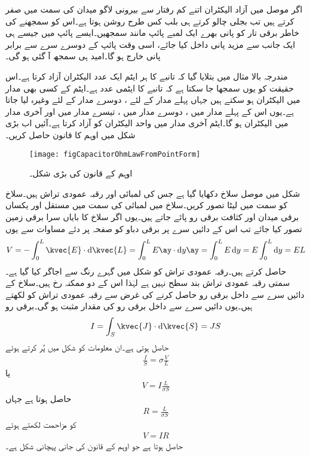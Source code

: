 اگر موصل میں آزاد الیکٹران اتنے کم رفتار سے بیرونی لاگو میدان کی سمت میں صفر کرتے ہیں تب بجلی چالو کرتے ہی بلب  کس طرح روشن ہوتا ہے۔اس کو سمجھنے کی خاطر برقی تار کو پانی بھرے ایک لمبے  پائپ مانند سمجھیں۔ایسے پائپ میں جیسے ہی ایک جانب سے مزید پانی داخل کیا جائے، اسی وقت پائپ کے دوسرے سرے سے برابر پانی خارج ہو گا۔امید ہی سمجھ آ گئی ہو گی۔  

مندرجہ بالا مثال میں بتلایا گیا کہ تانبے کا ہر ایٹم ایک عدد الیکٹران آزاد کرتا ہے۔اس حقیقت کو یوں سمجھا جا سکتا ہے کہ تانبے کا ایٹمی عدد ہے۔ایٹم کے کسی بھی مدار میں    الیکٹران ہو سکتے ہیں جہاں پہلے مدار کے لئے ، دوسرے مدار کے لئے  وغیرہ لیا جاتا ہے۔یوں اس کے پہلے مدار میں ، دوسرے مدار میں ، تیسرے مدار میں  اور آخری مدار میں  الیکٹران ہو گا۔ایٹم آخری مدار میں واحد الیکٹران کو آزاد کرتا ہے۔آئیں اب بڑی شکل میں اوہم کا قانون حاصل کریں۔ 
\begin{figure}
\centering
\texttt{[image: figCapacitorOhmLawFromPointForm]}
\caption{اوہم کے قانون کی بڑی شکل۔}
\label{شکل_کپیسٹر_اوہم_قانون_بڑی_شکل}
\end{figure}

شکل  میں  موصل سلاخ دکھایا گیا ہے جس کی لمبائی  اور  رقبہ عمودی تراش  ہیں۔سلاخ کو  سمت میں لیٹا تصور کریں۔سلاخ میں لمبائی کی سمت میں مستقل اور یکساں برقی میدان   اور کثافت برقی رو  پائے جاتے ہیں۔یوں اگر سلاخ کا بایاں سرا برقی زمین تصور کیا جائے تب اس کے دائیں سرے پر برقی دباو کو صفحہ  پر دئے مساوات  سے یوں
\begin{align*}
V= -\int_0^L \kvec{E} \cdot \dif \kvec{L}=\int_0^L E \ay \cdot \dif  y \ay=\int_0^L E \dif y=E\int_0^L \dif y=EL
\end{align*}
حاصل کرتے ہیں۔رقبہ عمودی تراش کو شکل میں گہرے رنگ سے اجاگر کیا گیا ہے۔سمتی رقبہ عمودی تراش بند سطح نہیں ہے لہٰذا اس کے دو ممکنہ رخ ہیں۔سلاخ کے دائیں سرے سے داخل برقی رو حاصل کرنے کی غرض سے رقبہ عمودی تراش کو  لکھتے ہیں۔یوں دائیں سرے سے داخل برقی رو کی مقدار مثبت ہو گی۔برقی رو
\begin{align*}
I=\int_S \kvec{J} \cdot \dif \kvec{S}=JS
\end{align*}
حاصل ہوتی ہے۔ان معلومات کو شکل  میں پُر کرتے ہوئے
\begin{align*}
\frac{I}{S}=\sigma \frac{V}{L}
\end{align*}
  یا
\begin{align*}
V=I \frac{L}{\sigma S}
\end{align*}
حاصل ہوتا ہے جہاں
\begin{align}\label{مساوات_کپیسٹر_سلاخ_کی_مزاحمت}
R= \frac{L}{\sigma S}
\end{align}
کو مزاحمت لکھتے ہوئے
\begin{align}\label{مساوات_کپیسٹر_اوہم_قانون_بڑی_شکل}
V=IR
\end{align}
حاصل ہوتا ہے جو اوہم کے قانون کی جانی پہچانی شکل ہے۔

